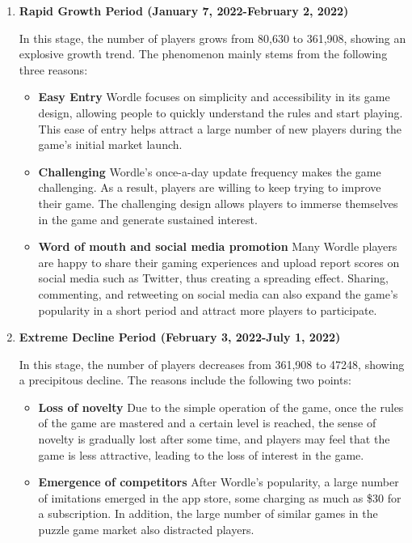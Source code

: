\documentclass[12pt]{article}  %
\begin{document}
\begin{enumerate}[\bfseries 1.]
	\setlength{\parsep}{0ex} %
	\setlength{\topsep}{0.5pt} %
	\setlength{\itemsep}{0.5pt} %
	\item \textbf{Rapid Growth Period (January 7, 2022-February 2, 2022)}
	
	In this stage, the number of players grows from 80,630 to 361,908, showing an explosive growth trend. The phenomenon mainly stems from the following three reasons:
	\begin{itemize}
		\setlength{\parsep}{0ex} 
		\setlength{\topsep}{2ex} 
		\setlength{\itemsep}{1ex} 
		\item \textbf{Easy Entry} Wordle focuses on simplicity and accessibility in its game design, allowing people to quickly understand the rules and start playing. This ease of entry helps attract a large number of new players during the game's initial market launch.
		\item \textbf{Challenging} Wordle's once-a-day update frequency makes the game challenging. As a result, players are willing to keep trying to improve their game. The challenging design allows players to immerse themselves in the game and generate sustained interest.
		\item \textbf{Word of mouth and social media promotion} Many Wordle players are happy to share their gaming experiences and upload report scores on social media such as Twitter, thus creating a spreading effect. Sharing, commenting, and retweeting on social media can also expand the game's popularity in a short period and attract more players to participate.
	\end{itemize}
	
	\item \textbf{Extreme Decline Period (February 3, 2022-July 1, 2022)}
	
	In this stage, the number of players decreases from 361,908 to 47248, showing a precipitous decline. The reasons include the following two points:
	\begin{itemize}
		\setlength{\parsep}{0ex} 
		\setlength{\topsep}{2ex} 
		\setlength{\itemsep}{1ex} 
		\item \textbf{Loss of novelty} Due to the simple operation of the game, once the rules of the game are mastered and a certain level is reached, the sense of novelty is gradually lost after some time, and players may feel that the game is less attractive, leading to the loss of interest in the game.
		\item \textbf{Emergence of competitors} After Wordle's popularity, a large number of imitations emerged in the app store, some charging as much as \$30 for a subscription. In addition, the large number of similar games in the puzzle game market also distracted players. 
	\end{itemize}
	

\end{enumerate}
\end{document}

